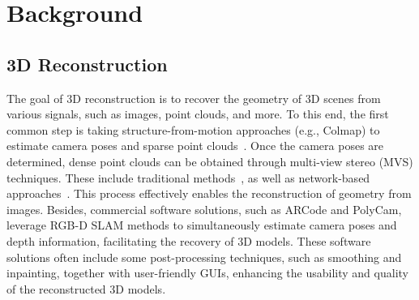\section{Background}
\label{sec:background_3d_recon}
\subsection{3D Reconstruction}
The goal of 3D reconstruction is to recover the geometry of 3D scenes from various signals, such as images, point clouds, and more. To this end, the first common step is taking structure-from-motion approaches (e.g., Colmap) to estimate camera poses and sparse point clouds~\citep{schoenberger2016sfm}. 
Once the camera poses are determined, dense point clouds can be obtained through multi-view stereo (MVS) techniques. These include traditional methods~\citep{schoenberger2016mvs}, as well as network-based approaches~\citep{yao2018mvsnet}. This process effectively enables the reconstruction of geometry from images.
Besides, commercial software solutions, such as ARCode and PolyCam, leverage RGB-D SLAM methods to simultaneously estimate camera poses and depth information, facilitating the recovery of 3D models. These software solutions often include some post-processing techniques, such as smoothing and inpainting, together with user-friendly GUIs, enhancing the usability and quality of the reconstructed 3D models.



